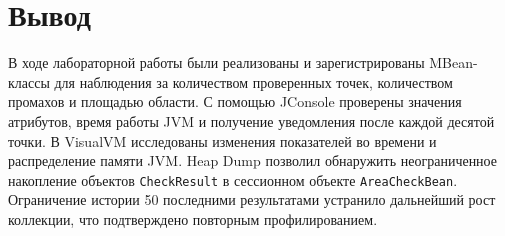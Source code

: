 \documentclass[a4paper,14pt]{extarticle}
\begin{document}
\newpage
\section*{Вывод}

В ходе лабораторной работы были реализованы и зарегистрированы MBean-классы для наблюдения за количеством проверенных точек, количеством промахов и площадью области. С помощью JConsole проверены значения атрибутов, время работы JVM и получение уведомления после каждой десятой точки. В VisualVM исследованы изменения показателей во времени и распределение памяти JVM. Heap Dump позволил обнаружить неограниченное накопление объектов \texttt{CheckResult} в сессионном объекте \texttt{AreaCheckBean}. Ограничение истории 50 последними результатами устранило дальнейший рост коллекции, что подтверждено повторным профилированием.
\end{document}
